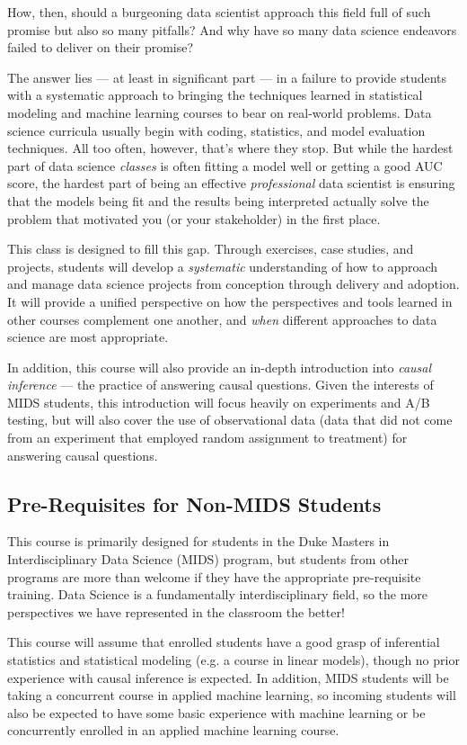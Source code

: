 \documentclass[12pt]{article}
\begin{document}
How, then, should a burgeoning data scientist approach this field full of such promise but also so many pitfalls? And why have so many data science endeavors failed to deliver on their promise?

The answer lies — at least in significant part — in a failure to provide students with a systematic approach to bringing the techniques learned in statistical modeling and machine learning courses to bear on real-world problems. Data science curricula usually begin with coding, statistics, and model evaluation techniques. All too often, however, that's where they stop. But while the hardest part of data science \emph{classes} is often fitting a model well or getting a good AUC score, the hardest part of being an effective \emph{professional} data scientist is ensuring that the models being fit and the results being interpreted actually solve the problem that motivated you (or your stakeholder) in the first place.

This class is designed to fill this gap. Through exercises, case studies, and projects, students will develop a \emph{systematic} understanding of how to approach and manage data science projects from conception through delivery and adoption. It will provide a unified perspective on how the perspectives and tools learned in other courses complement one another, and \emph{when} different approaches to data science are most appropriate. 

In addition, this course will also provide an in-depth introduction into \emph{causal inference} — the practice of answering causal questions. Given the interests of MIDS students, this introduction will focus heavily on experiments and A/B testing, but will also cover the use of observational data (data that did not come from an experiment that employed random assignment to treatment) for answering causal questions.

\subsection{Pre-Requisites for Non-MIDS Students}

This course is primarily designed for students in the Duke Masters in Interdisciplinary Data Science (MIDS) program, but students from other programs are more than welcome if they have the appropriate pre-requisite training. Data Science is a fundamentally interdisciplinary field, so the more perspectives we have represented in the classroom the better!

This course will assume that enrolled students have a good grasp of inferential statistics and statistical modeling (e.g. a course in linear models), though no prior experience with causal inference is expected. In addition, MIDS students will be taking a concurrent course in applied machine learning, so incoming students will also be expected to have some basic experience with machine learning or be concurrently enrolled in an applied machine learning course.
\end{document}
